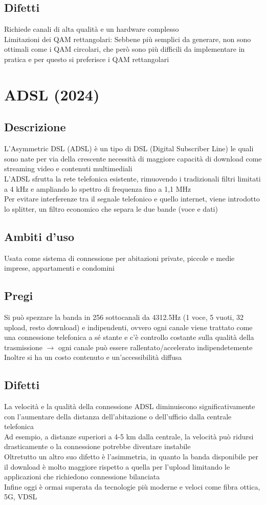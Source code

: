 \documentclass[10pt,oneside,a4paper]{article}
\begin{document}
\subsection{Difetti}
Richiede canali di alta qualità e un hardware complesso\\
Limitazioni dei QAM rettangolari: Sebbene più semplici da generare, non sono ottimali come i QAM circolari, che però sono più difficili da implementare in pratica e per questo si preferisce i QAM rettangolari
\section{ADSL (2024)}
\subsection{Descrizione}
L'Asymmetric DSL (ADSL) è un tipo di DSL (Digital Subscriber Line) le quali sono nate per via della crescente necessità di maggiore capacità di download come streaming video e contenuti multimediali\\
L'ADSL sfrutta la rete telefonica esistente, rimuovendo i tradizionali filtri limitati a 4 kHz e ampliando lo spettro di frequenza fino a 1,1 MHz\\
Per evitare interferenze tra il segnale telefonico e quello internet, viene introdotto lo splitter, un filtro economico che separa le due bande (voce e dati)
\subsection{Ambiti d'uso}
Usata come sistema di connessione per abitazioni private, piccole e medie imprese, appartamenti e condomini
\subsection{Pregi}
Si può spezzare la banda in 256 sottocanali da 4312.5Hz (1 voce, 5 vuoti, 32 upload, resto download) e indipendenti, ovvero ogni canale viene trattato come una connessione telefonica a sé stante e c'è controllo costante sulla qualità della trasmissione $\to$ ogni canale può essere rallentato/accelerato indipendetemente\\
Inoltre si ha un costo contenuto e un'accessibilità diffusa
\subsection{Difetti}
La velocità e la qualità della connessione ADSL diminuiscono significativamente con l'aumentare della distanza dell'abitazione o dell'ufficio dalla centrale telefonica\\
Ad esempio, a distanze superiori a 4-5 km dalla centrale, la velocità può ridursi drasticamente o la connessione potrebbe diventare instabile\\
Oltretutto un altro suo difetto è l'asimmetria, in quanto la banda disponibile per il download è molto maggiore rispetto a quella per l'upload limitando le applicazioni che richiedono connessione bilanciata\\
Infine oggi è ormai superata da tecnologie più moderne e veloci come fibra ottica, 5G, VDSL
\end{document}
